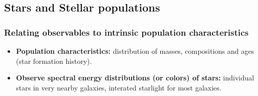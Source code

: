 \documentclass{article}
\begin{document}
\subsection{Stars and Stellar populations}

\subsubsection{Relating observables to intrinsic population characteristics}
\begin{itemize} %
    \item \textbf{Population characteristics:} distribution of masses, compositions
        and ages (star formation history).
    \item \textbf{Observe spectral energy distributions (or colors) of stars:}
        individual stars in very nearby galaxies, interated starlight
        for most galaxies.
\end{itemize}%
\end{document}
